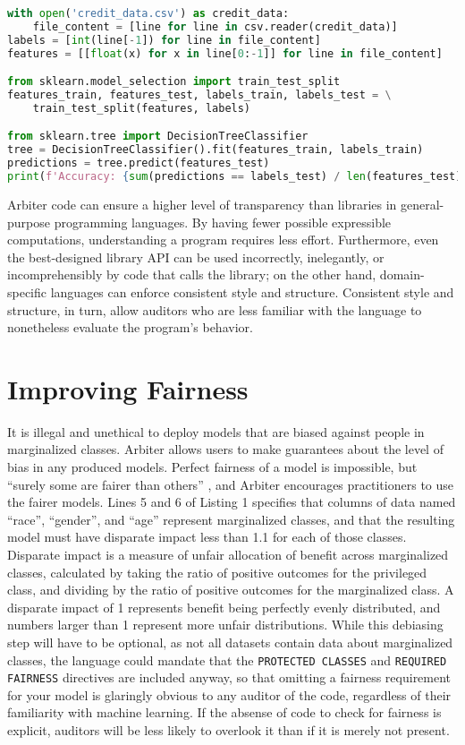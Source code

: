 \documentclass[letterpaper]{article}
\newcommand{\citep}[1]{\cite{#1}}
\begin{document}
\begin{lstlisting}[language=Python,caption=Python code equivalent to Listing 1.]
with open('credit_data.csv') as credit_data:
    file_content = [line for line in csv.reader(credit_data)]
labels = [int(line[-1]) for line in file_content]
features = [[float(x) for x in line[0:-1]] for line in file_content]

from sklearn.model_selection import train_test_split
features_train, features_test, labels_train, labels_test = \
    train_test_split(features, labels)

from sklearn.tree import DecisionTreeClassifier
tree = DecisionTreeClassifier().fit(features_train, labels_train)
predictions = tree.predict(features_test)
print(f'Accuracy: {sum(predictions == labels_test) / len(features_test)}')
\end{lstlisting}

Arbiter code can ensure a higher level of transparency than libraries in general-purpose programming languages. By having fewer possible expressible computations, understanding a program requires less effort. Furthermore, even the best-designed library API can be used incorrectly, inelegantly, or incomprehensibly by code that calls the library; on the other hand, domain-specific languages can enforce consistent style and structure. Consistent style and structure, in turn, allow auditors who are less familiar with the language to nonetheless evaluate the program's behavior. 

\section{Improving Fairness}
It is illegal and unethical to deploy models that are biased against people in marginalized classes. Arbiter allows users to make guarantees about the level of bias in any produced models. Perfect fairness of a model is impossible, but ``surely some are fairer than others'' \citep{Grant2019}, and Arbiter encourages practitioners to use the fairer models. Lines 5 and 6 of Listing 1 specifies that columns of data named ``race'', ``gender'', and ``age'' represent marginalized classes, and that the resulting model must have disparate impact less than 1.1 for each of those classes. Disparate impact is a measure of unfair allocation of benefit across marginalized classes, calculated by taking the ratio of positive outcomes for the privileged class, and dividing by the ratio of positive outcomes for the marginalized class. A disparate impact of 1 represents benefit being perfectly evenly distributed, and numbers larger than 1 represent more unfair distributions. While this debiasing step will have to be optional, as not all datasets contain data about marginalized classes, the language could mandate that the \texttt{PROTECTED CLASSES} and \texttt{REQUIRED FAIRNESS} directives are included anyway, so that omitting a fairness requirement for your model is glaringly obvious to any auditor of the code, regardless of their familiarity with machine learning. If the absense of code to check for fairness is explicit, auditors will be less likely to overlook it than if it is merely not present. 
\end{document}
